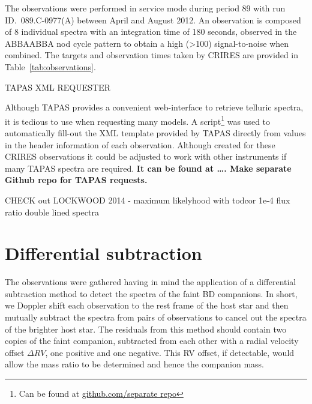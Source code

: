 The observations were performed in service mode during period 89 with run ID.~089.C-0977(A) between April and August 2012. An observation is composed of 8 individual spectra with an integration time of 180 seconds, observed in the ABBAABBA nod cycle pattern to obtain a high (>100) signal-to-noise when combined. The targets and observation times taken by CRIRES are provided in Table~\ref{tab:observations}.




TAPAS XML REQUESTER

Although TAPAS provides a convenient web-interface to retrieve telluric spectra, it is tedious to use when requesting many models. A script\footnote{Can be found at \url{github.com/separate repo}} was used to automatically fill-out the XML template provided by TAPAS directly from values in the header information of each observation. Although created for these CRIRES observations it could be adjusted to work with other instruments if many TAPAS spectra are required. \textbf{It can be found at \ldots. Make separate Github repo for TAPAS requests.}









CHECK out LOCKWOOD 2014 - maximum likelyhood with todcor   1e-4 flux ratio double lined spectra




\section{Differential subtraction}
\label{sec:spec_diff}

The observations were gathered having in mind the application of a differential subtraction method \citep[e.g.][]{ferluga_separating_1997, kostogryz_spectral_2013} to detect the spectra of the faint BD companions. In short, we Doppler shift each observation to the rest frame of the host star and then mutually subtract the spectra from pairs of observations to cancel out the spectra of the brighter host star. The residuals from this method should contain two copies of the faint companion, subtracted from each other with a radial velocity offset \(\Delta RV\), one positive and one negative. This RV offset, if detectable, would allow the mass ratio to be determined and hence the companion mass. 

